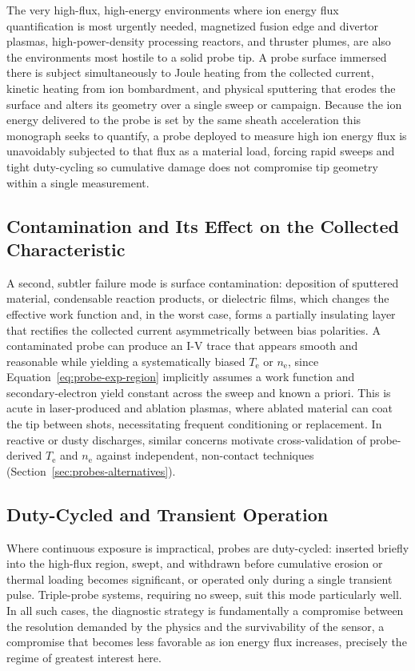 The very high-flux, high-energy environments where ion energy flux quantification is most urgently needed, magnetized fusion edge and divertor plasmas, high-power-density processing reactors, and thruster plumes, are also the environments most hostile to a solid probe tip. A probe surface immersed there is subject simultaneously to Joule heating from the collected current, kinetic heating from ion bombardment, and physical sputtering that erodes the surface and alters its geometry over a single sweep or campaign. Because the ion energy delivered to the probe is set by the same sheath acceleration this monograph seeks to quantify, a probe deployed to measure high ion energy flux is unavoidably subjected to that flux as a material load, forcing rapid sweeps and tight duty-cycling so cumulative damage does not compromise tip geometry within a single measurement.

\subsection{Contamination and Its Effect on the Collected Characteristic}

A second, subtler failure mode is surface contamination: deposition of sputtered material, condensable reaction products, or dielectric films, which changes the effective work function and, in the worst case, forms a partially insulating layer that rectifies the collected current asymmetrically between bias polarities. A contaminated probe can produce an I-V trace that appears smooth and reasonable while yielding a systematically biased $T_{\mathrm{e}}$ or $n_{\mathrm{e}}$, since Equation~\eqref{eq:probe-exp-region} implicitly assumes a work function and secondary-electron yield constant across the sweep and known a priori. This is acute in laser-produced and ablation plasmas, where ablated material can coat the tip between shots, necessitating frequent conditioning or replacement. In reactive or dusty discharges, similar concerns motivate cross-validation of probe-derived $T_{\mathrm{e}}$ and $n_{\mathrm{e}}$ against independent, non-contact techniques (Section~\ref{sec:probes-alternatives}).

\subsection{Duty-Cycled and Transient Operation}

Where continuous exposure is impractical, probes are duty-cycled: inserted briefly into the high-flux region, swept, and withdrawn before cumulative erosion or thermal loading becomes significant, or operated only during a single transient pulse. Triple-probe systems, requiring no sweep, suit this mode particularly well. In all such cases, the diagnostic strategy is fundamentally a compromise between the resolution demanded by the physics and the survivability of the sensor, a compromise that becomes less favorable as ion energy flux increases, precisely the regime of greatest interest here.

